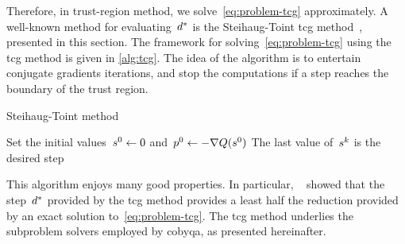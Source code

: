 Therefore, in trust-region method, we solve~\cref{eq:problem-tcg} approximately.
A well-known method for evaluating~$\step[\ast]$ is the Steihaug-Toint \gls{tcg} method~\cite{Steihaug_1983,Toint_1981}, presented in this section.
The framework for solving~\cref{eq:problem-tcg} using the \gls{tcg} method is given in \cref{alg:tcg}.
The idea of the algorithm is to entertain conjugate gradients iterations, and stop the computations if a step reaches the boundary of the trust region.

\begin{algorithm}
    \caption{Steihaug-Toint  method}
    \label{alg:tcg}
    \DontPrintSemicolon
    \onehalfspacing
    Set the initial values~$\sstep[0] \gets 0$ and~$\pstep[0] \gets -\nabla Q(\sstep[0])$\;
    The last value of~$\sstep[k]$ is the desired step\;
\end{algorithm}

This algorithm enjoys many good properties.
In particular, \citeauthor{Yuan_2000}~\cite{Yuan_2000} showed that the step~$\step[\ast]$ provided by the \gls{tcg} method provides a least half the reduction provided by an exact solution to~\cref{eq:problem-tcg}.
The \gls{tcg} method underlies the subproblem solvers employed by \gls{cobyqa}, as presented hereinafter.

